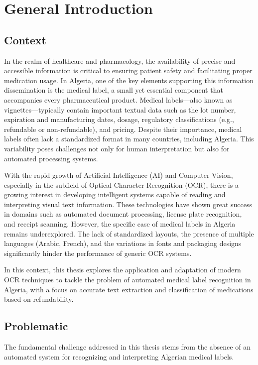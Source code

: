 \chapter*{General Introduction}

\section*{Context}

In the realm of healthcare and pharmacology, the availability of precise and accessible information is critical to ensuring patient safety and facilitating proper medication usage. In Algeria, one of the key elements supporting this information dissemination is the medical label, a small yet essential component that accompanies every pharmaceutical product. Medical labels—also known as vignettes—typically contain important textual data such as the lot number, expiration and manufacturing dates, dosage, regulatory classifications (e.g., refundable or non-refundable), and pricing. Despite their importance, medical labels often lack a standardized format in many countries, including Algeria. This variability poses challenges not only for human interpretation but also for automated processing systems.

With the rapid growth of Artificial Intelligence (AI) and Computer Vision, especially in the subfield of Optical Character Recognition (OCR), there is a growing interest in developing intelligent systems capable of reading and interpreting visual text information. These technologies have shown great success in domains such as automated document processing, license plate recognition, and receipt scanning. However, the specific case of medical labels in Algeria remains underexplored. The lack of standardized layouts, the presence of multiple languages (Arabic, French), and the variations in fonts and packaging designs significantly hinder the performance of generic OCR systems.

In this context, this thesis explores the application and adaptation of modern OCR techniques to tackle the problem of automated medical label recognition in Algeria, with a focus on accurate text extraction and classification of medications based on refundability.

\section*{Problematic}

The fundamental challenge addressed in this thesis stems from the absence of an automated system for recognizing and interpreting Algerian medical labels. %

